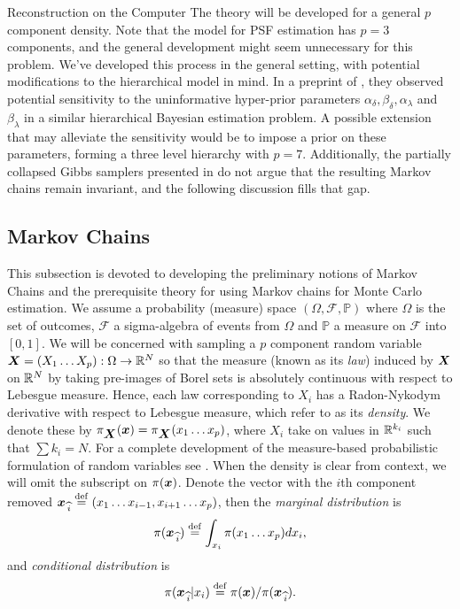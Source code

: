 \begin{chapter}{Reconstruction on the Computer}
The theory will be developed for a general $p$ component density.
Note that the model for PSF estimation has $p=3$ components, and the general development might seem unnecessary for this problem.
We've developed this process in the general setting, with potential modifications to the hierarchical model in mind.
In a preprint of \citep{howard2016bayesian}, they observed potential sensitivity to the uninformative hyper-prior parameters $\alpha_\delta,\beta_\delta,\alpha_\lambda$ and $\beta_\lambda$ in a similar hierarchical Bayesian estimation problem.
A possible extension that may alleviate the sensitivity would be to impose a prior on these parameters, forming a three level hierarchy with $p=7$.
Additionally, the partially collapsed Gibbs samplers presented in \citep{van2015metropolis,van2008partially} do not argue that the resulting Markov chains remain invariant, and the following discussion fills that gap.

  \subsection{Markov Chains}
This subsection is devoted to developing the preliminary notions of Markov Chains and the prerequisite theory for using Markov chains for Monte Carlo estimation. 
We assume a probability (measure) space $(\Omega,\mathcal F,\mathbb P)$ where $\Omega$ is the set of outcomes, $\mathcal F$ a sigma-algebra of events from $\Omega$ and $\mathbb P$ a measure on $\mathcal F$ into $[0,1]$.
We will be concerned with sampling a $p$ component random variable $\mbox{\boldmath$X$} = (X_1\dots X_p):\Omega \to \mathbb R^N$ so that the measure (known as its \emph{law}) induced by $\mbox{\boldmath$X$}$ on $\mathbb R^N$ by taking pre-images of Borel sets is absolutely continuous with respect to Lebesgue measure.
Hence, each law corresponding to $X_i$ has a Radon-Nykodym derivative with respect to Lebesgue measure, which refer to as its \emph{density}. 
We denote these by $\pi_{\mbox{\boldmath$X$}}(\mbox{\boldmath$x$}) = \pi_{\mbox{\boldmath$X$}}(x_1\dots x_p)$, where $X_i$ take on values in $\mathbb R^{k_i}$ such that $\sum k_i = N$.
For a complete development of the measure-based probabilistic formulation of random variables see \citep{durrett2010probability,billingsley2008probability}.
When the density is clear from context, we will omit the subscript on $\pi(\mbox{\boldmath$x$})$.
Denote the vector with the $i$th component removed $\mbox{\boldmath$x$}_{\,\widehat{i}} \stackrel{\rm def}{=} (x_1\dots x_{i-1},x_{i+1}\dots x_p)$, then the \emph{marginal distribution} is
\begin{equation}
  \pi(\mbox{\boldmath$x$}_{\,\widehat{i}}) \stackrel{\rm def}{=} \int_{x_i} \pi(x_1\dots x_p)dx_i,
\end{equation}
and \emph{conditional distribution} is
\begin{equation}
  \pi(\mbox{\boldmath$x$}_{\,\widehat{i}}| x_i) \stackrel{\rm def}{=} \pi(\mbox{\boldmath$x$})/\pi(\mbox{\boldmath$x$}_{\,\widehat{i}}).
\end{equation}
  

\end{chapter}
